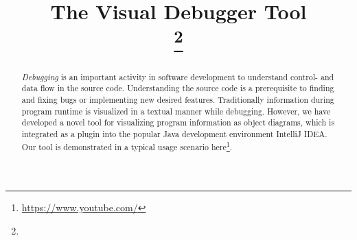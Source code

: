 \documentclass[conference]{IEEEtran}
\newcommand{\intellij}{IntelliJ IDEA}
\newcommand{\screencast}{\url{https://www.youtube.com/}}
\begin{document}
\title{The Visual Debugger Tool\\
{}
\thanks{}
}

\author{
}

\maketitle


\begin{abstract}
\emph{Debugging} is an important activity in software development to understand control- and data flow in the source code.
Understanding the source code is a prerequisite to finding and fixing bugs or implementing new desired features. 
Traditionally information during program runtime is visualized in a textual manner while debugging.
However, we have developed a novel tool for visualizing program information as object diagrams, which is integrated as a plugin into the popular Java development environment \intellij{}.
Our tool is demonstrated in a typical usage scenario here\footnote{\screencast}.
\end{abstract}
\end{document}
